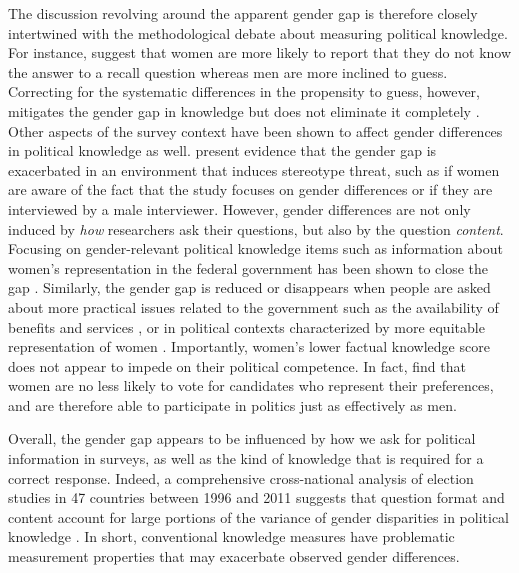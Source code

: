 The discussion revolving around the apparent gender gap is therefore closely intertwined with the methodological debate about measuring political knowledge. For instance, \citet{mondak2004knowledge} suggest that women are more likely to report that they do not know the answer to a recall question whereas men are more inclined to guess. Correcting for the systematic differences in the propensity to guess, however, mitigates the gender gap in knowledge but does not eliminate it completely \citep[see also][]{lizotte2009explaining,ferrin2017gender}. Other aspects of the survey context have been shown to affect gender differences in political knowledge as well. \citet{mcglone2006stereotype} present evidence that the gender gap is exacerbated in an environment that induces stereotype threat, such as if women are aware of the fact that the study focuses on gender differences or if they are interviewed by a male interviewer. However, gender differences are not only induced by \textit{how} researchers ask their questions, but also by the question \textit{content}. Focusing on gender-relevant political knowledge items such as information about women's representation in the federal government has been shown to close the gap \citep{graber2001processing,dolan2011women,fraile2014does,jerit2017revisiting}. Similarly, the gender gap is reduced or disappears when people are asked about more practical issues related to the government such as the availability of benefits and services \citep{stolle2010women}, or in political contexts characterized by more equitable representation of women \citep{pereira2019gendered,mcallister2019gender,wolak2019descriptive}. Importantly, women's lower factual knowledge score does not appear to impede on their political competence. In fact, \citet{dassonneville2020women} find that women are no less likely to vote for candidates who represent their preferences, and are therefore able to participate in politics just as effectively as men.

Overall, the gender gap appears to be influenced by how we ask for political information in surveys, as well as the kind of knowledge that is required for a correct response. Indeed, a comprehensive cross-national analysis of election studies in 47 countries between 1996 and 2011 suggests that question format and content account for large portions of the variance of gender disparities in political knowledge \citep{fortin2016cross,fortin2020political}. In short, conventional knowledge measures have problematic measurement properties that may exacerbate observed gender differences. 


